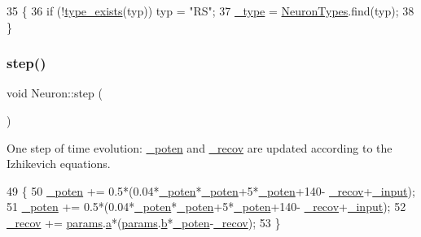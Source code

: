 \begin{DoxyCode}
35                                    \{    
36     \textcolor{keywordflow}{if} (!\hyperlink{classNeuron_a3a80c93e7cf5214b5e1a9925742bbe8e}{type\_exists}(typ)) typ = \textcolor{stringliteral}{"RS"};
37     \hyperlink{classNeuron_af48de7c2ad739fc5d57bfa2f3b1f7663}{\_type} = \hyperlink{classNeuron_ab4b47274e756b72923d2f8a9a5037d23}{NeuronTypes}.find(typ);
38 \}
\end{DoxyCode}
\mbox{\label{classNeuron_a224d5cead5f94bbe15ae49774db3e174}} 
\subsubsection{\texorpdfstring{step()}{step()}}
{\footnotesize\ttfamily void Neuron\+::step (\begin{DoxyParamCaption}{ }\end{DoxyParamCaption})}

One step of time evolution\+: \hyperlink{classNeuron_a7f7fdc3f9550b870351c60f618c11376}{\+\_\+poten} and \hyperlink{classNeuron_a7bc9f5b85125f2c2596b64766796002b}{\+\_\+recov} are updated according to the Izhikevich equations. 
\begin{DoxyCode}
49                   \{
50     \hyperlink{classNeuron_a7f7fdc3f9550b870351c60f618c11376}{\_poten} += 0.5*(0.04*\hyperlink{classNeuron_a7f7fdc3f9550b870351c60f618c11376}{\_poten}*\hyperlink{classNeuron_a7f7fdc3f9550b870351c60f618c11376}{\_poten}+5*\hyperlink{classNeuron_a7f7fdc3f9550b870351c60f618c11376}{\_poten}+140-
      \hyperlink{classNeuron_a7bc9f5b85125f2c2596b64766796002b}{\_recov}+\hyperlink{classNeuron_ac1311b3b22122a67743615ee40caba6d}{\_input});
51     \hyperlink{classNeuron_a7f7fdc3f9550b870351c60f618c11376}{\_poten} += 0.5*(0.04*\hyperlink{classNeuron_a7f7fdc3f9550b870351c60f618c11376}{\_poten}*\hyperlink{classNeuron_a7f7fdc3f9550b870351c60f618c11376}{\_poten}+5*\hyperlink{classNeuron_a7f7fdc3f9550b870351c60f618c11376}{\_poten}+140-
      \hyperlink{classNeuron_a7bc9f5b85125f2c2596b64766796002b}{\_recov}+\hyperlink{classNeuron_ac1311b3b22122a67743615ee40caba6d}{\_input});
52     \hyperlink{classNeuron_a7bc9f5b85125f2c2596b64766796002b}{\_recov} += \hyperlink{classNeuron_a9427965b6669c7c35c327689de7a4d63}{params}.\hyperlink{structNeuronParams_a359703733f5e70bbd67d019e45a3bc85}{a}*(\hyperlink{classNeuron_a9427965b6669c7c35c327689de7a4d63}{params}.\hyperlink{structNeuronParams_abd1bd37179d8efa115a8749f9252f77d}{b}*\hyperlink{classNeuron_a7f7fdc3f9550b870351c60f618c11376}{\_poten}-\hyperlink{classNeuron_a7bc9f5b85125f2c2596b64766796002b}{\_recov});
53 \}
\end{DoxyCode}
\mbox{\label{classNeuron_abcf0b4ecd00cba630bfd2e764a61b5ee}} 
